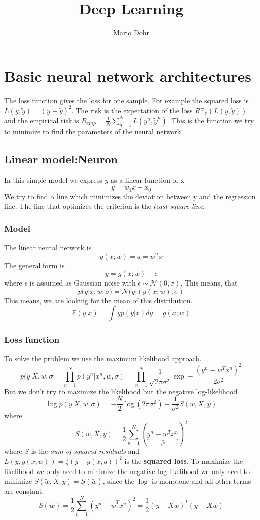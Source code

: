 \documentclass[10pt,a4paper]{article}
\author{Mario Dohr}
\title{Deep Learning}
\begin{document}
\maketitle

\section{Basic neural network architectures}
The loss function gives the loss for one sample. For example the squared loss is $L(y,\tilde{y}) = (y-\tilde{y})^2$.
The risk is the expectation of the loss $R\mathbb{E}_z(L(y,\tilde{y}))$ and the empirical risk is 
$R_{emp} = \frac{1}{N} \sum_{n=1}^N L(y^n,\tilde{y}^n)$. This is the function we try to minimize to find the parameters of the neural network.
\subsection{Linear model:Neuron}
In this simple model we express $y$ as a linear function of x
\[ y = w_1 x + x_0\]
We try to find a line which minimizes the deviation between y and the regression line. The line that optimizes the criterion is
the \textit{least square line}.

\subsubsection{Model}
The linear neural network is
\[ g(x;w) = a = w^Tx \]
The general form is 
\[ y = g(x;w) + \epsilon\]
where $\epsilon$ is assumed as Gaussian noise with $\epsilon \sim \mathcal{N}(0,\sigma)$. This means, that 
\[ p(y | x, w, \sigma) = \mathcal{N}(y | (g(x;w), \sigma) \]
This means, we are looking for the mean of this distribution.
\[ \mathbb{E}(y | x) = \int y p(y | x) dy = g(x;w) \]

\subsubsection{Loss function}
To solve the problem we use the maximum likelihood approach.
\[ p(y | X, w, \sigma = \prod_{n=1}^N p( y^n | x^n, w, \sigma) = 
\prod_{n=1}^N  \frac{1}{\sqrt{2 \pi \sigma^2}} \exp - \frac{(y^n - w^T x^n)^2}{2 \sigma^2} \]
But we don't try to maximize the likelihood but the negative log-likelihood
\[ \log p(y | X, w, \sigma) = -\frac{N}{2}\log(2\pi\sigma^2) - \frac{1}{\sigma^2} S(w, X, y)\]
where 
\[ S(w, X, y) = \frac{1}{2} \sum_{n=1}^N (\underbrace{y^n - w^Tx^n}_{\epsilon^n})^2\]
where $S$ is the \textit{sum of squared residuals} and $L(y,g(x,w)) = \frac{1}{2}(y - g(x,q))^2$ is the \textbf{squared loss}.
To maximize the likelihood we only need to minimize the negative log-likelihood we only need to minimize $S(\tilde{w}, X,y) = S(\tilde{w})$, since the $\log$ is monotone and  all other terms are constant.
\[ S(\tilde{w}) = \frac{1}{2} \sum_{n=1}^N (y^n - \tilde{w}^Tx^n)^2 = \frac{1}{2} (y - X\tilde{w})^T(y - X\tilde{w})\]
\end{document}
